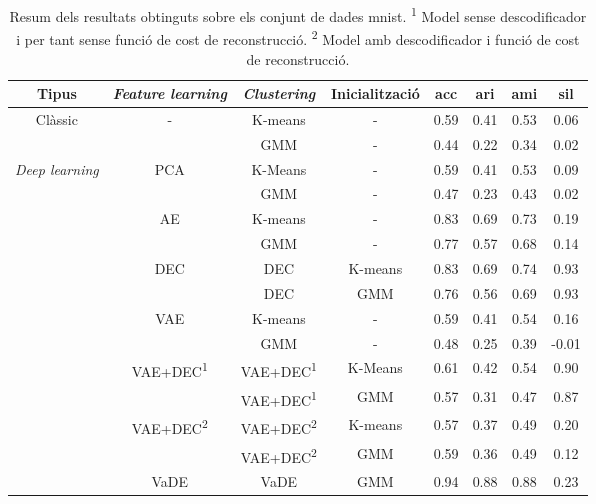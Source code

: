 \documentclass[CAT,BIB]{TFUOC}%
\begin{document}
        \begin{table}[p]
            \small
            \centering
            \begin{minipage}{\textwidth}

            \begin{tabular}{@{}cccccccc@{}}
                \toprule
                \textbf{Tipus} & \textbf{\textit{Feature learning}} & \textbf{\textit{Clustering}} & \textbf{Inicialització} & \textbf{\gls{acc}} & \textbf{\gls{ari}} & \textbf{\gls{ami}} & \textbf{\gls{sil}} \\ \midrule
                \multirow{2}{*}{Clàssic} & \multirow{2}{*}{-} & K-means & - & 0.59 & 0.41 & 0.53 & 0.06 \\
                &  & GMM & - & 0.44 & 0.22 & 0.34 & 0.02 \\
                \multirow{13}{*}{\textit{Deep learning}} & \multirow{2}{*}{PCA} & K-Means & - & 0.59 & 0.41 & 0.53 & 0.09 \\
                &  & GMM & - & 0.47 & 0.23 & 0.43 & 0.02 \\  \midrule
                & \multirow{2}{*}{AE} & K-means & - & 0.83 & 0.69 & 0.73 & 0.19 \\
                &  & GMM & - & 0.77 & 0.57 & 0.68 & 0.14 \\
                & \multirow{2}{*}{DEC} & DEC & K-means & 0.83 & 0.69 & 0.74 & 0.93 \\
                &  & DEC & GMM & 0.76 & 0.56 & 0.69 & 0.93 \\
                & \multirow{2}{*}{VAE} & K-means & - & 0.59 & 0.41 & 0.54 & 0.16 \\
                &  & GMM & - & 0.48 & 0.25 & 0.39 & -0.01 \\
                & \multirow{2}{*}{VAE+DEC\textsuperscript{1}} & VAE+DEC\textsuperscript{1} & K-Means & 0.61 & 0.42 & 0.54 & 0.90 \\
                &  & VAE+DEC\textsuperscript{1} & GMM & 0.57 & 0.31 & 0.47 & 0.87 \\
                & \multirow{2}{*}{VAE+DEC\textsuperscript{2}} & VAE+DEC\textsuperscript{2} & K-means & 0.57 & 0.37 & 0.49 & 0.20 \\
                &  & VAE+DEC\textsuperscript{2} & GMM & 0.59 & 0.36 & 0.49 & 0.12 \\
                & VaDE & VaDE & GMM & 0.94 & 0.88 & 0.88 & 0.23 \\ \bottomrule
            \end{tabular}
            \caption[MNIST: resultats]{Resum dels resultats obtinguts sobre els conjunt de dades \gls{mnist}.
                \newline \textsuperscript{1} Model sense descodificador i per tant sense funció de cost de reconstrucció.
                \newline \textsuperscript{2} Model amb descodificador i funció de cost de reconstrucció.
            }
            \label{t:results_mnist}
            \end{minipage}
        \end{table}
\end{document}
